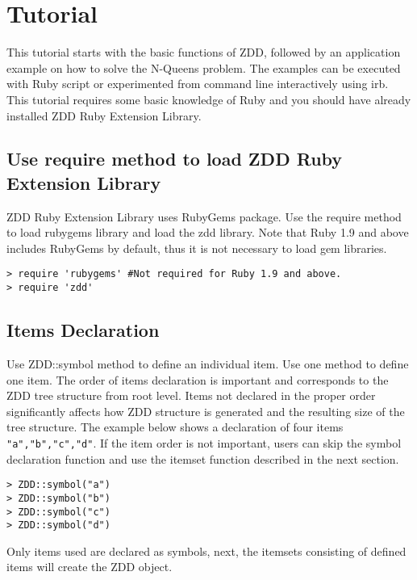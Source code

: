%

\chapter{Tutorial\label{sect:tutorial}}

This tutorial starts with the basic functions of ZDD, followed by an application example on how to solve the N-Queens problem. The examples can be executed with Ruby script or  experimented from command line interactively using irb. This tutorial requires some basic knowledge of Ruby and you should have already installed ZDD Ruby Extension Library. 

\section{Use require method to load ZDD Ruby Extension Library}
ZDD Ruby Extension Library uses RubyGems package. Use the require method to load rubygems library and load the zdd library. Note that Ruby 1.9 and above includes RubyGems by default, thus it is not necessary to load gem libraries. 

\begin{Verbatim}[baselinestretch=0.7,frame=single]
> require 'rubygems' #Not required for Ruby 1.9 and above.
> require 'zdd'
\end{Verbatim}

\section{Items Declaration\label{sect:tut_symbol}}
Use ZDD::symbol method to define an individual item. Use one method to define one item.
The order of items declaration is important and corresponds to the ZDD tree structure from root level.
Items not declared in the proper order significantly affects how ZDD structure is generated and the resulting size of the tree structure.   
The example below shows a declaration of four items \verb|"a","b","c","d"|.
If the item order is not important, users can skip the symbol declaration function and use the itemset function described in the next section. 

\begin{Verbatim}[baselinestretch=0.7,frame=single]
> ZDD::symbol("a")
> ZDD::symbol("b")
> ZDD::symbol("c")
> ZDD::symbol("d")
\end{Verbatim}

Only items used are declared as symbols, next, the itemsets consisting of defined items will create the ZDD object.


